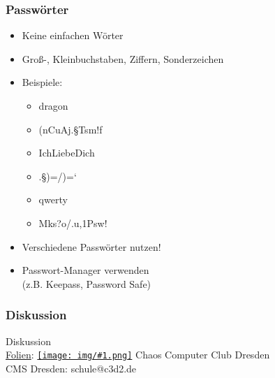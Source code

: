 \documentclass[12pt]{beamer}
\newcommand{\cc}[1]{\texttt{[image: img/\#1.png]}\hspace{1mm}}
\begin{document}
\begin{frame}
    \frametitle{Passwörter}
    \begin{itemize}
        \item<2-> Keine einfachen Wörter
        \item<3-> Groß-, Kleinbuchstaben, Ziffern, Sonderzeichen
        \item<4-> Beispiele:
            \begin{itemize}
                \item<5-> dragon
                \item<6-> (nCuAj.§Tsm!f
                \item<7-> IchLiebeDich
                \item<8-> .§)=/)=`
                \item<9-> qwerty
                \item<10-> Mks?o/.u,1Psw!
            \end{itemize}
        \item<12-> Verschiedene Passwörter nutzen!
        \item<13-> Passwort-Manager verwenden \\ (z.B. Keepass, Password Safe)
    \end{itemize}
\end{frame}

\begin{frame}
  \frametitle{Diskussion}
  \begin{center}
    {\Large Diskussion}\\
    \vspace{5mm}
    \href{https://github.com/c3d2/cms-nsa}{Folien}: \href{https://creativecommons.org/licenses/by-sa/4.0/}{\cc{by-sa}} Chaos Computer Club Dresden \\
    \vspace{4mm}
    CMS Dresden: schule@c3d2.de
  \end{center}
\end{frame}
\end{document}
